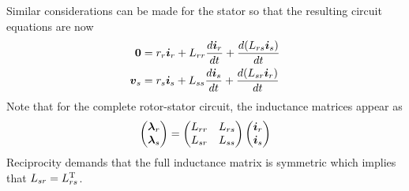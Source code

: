 \documentclass[onecolumn]{gwclass}
\begin{document}
	Similar considerations can be made for the stator so that the resulting circuit equations are now
	\begin{align*}
		\boldsymbol{0} &= r_r\boldsymbol{i}_r + L_{rr}\frac{d\boldsymbol{i}_r}{dt} + \frac{d(L_{rs}\boldsymbol{i}_s)}{dt} \\
		\boldsymbol{v}_s &= r_s\boldsymbol{i}_s + L_{ss}\frac{d\boldsymbol{i}_s}{dt} + \frac{d(L_{sr}\boldsymbol{i}_r)}{dt}
	\end{align*}
	Note that for the complete rotor-stator circuit, the inductance matrices appear as
	$$ \begin{pmatrix}
		\boldsymbol{\lambda}_r \\
		\boldsymbol{\lambda}_s
	\end{pmatrix} =\begin{pmatrix}
	L_{rr} & L_{rs} \\
	L_{sr} & L_{ss}
\end{pmatrix}\begin{pmatrix}
\boldsymbol{i}_r \\
\boldsymbol{i}_s
\end{pmatrix}$$
Reciprocity demands that the full inductance matrix is symmetric which implies that $L_{sr}=L_{rs}^{\text{\normalfont{T}}}$.
\end{document}
